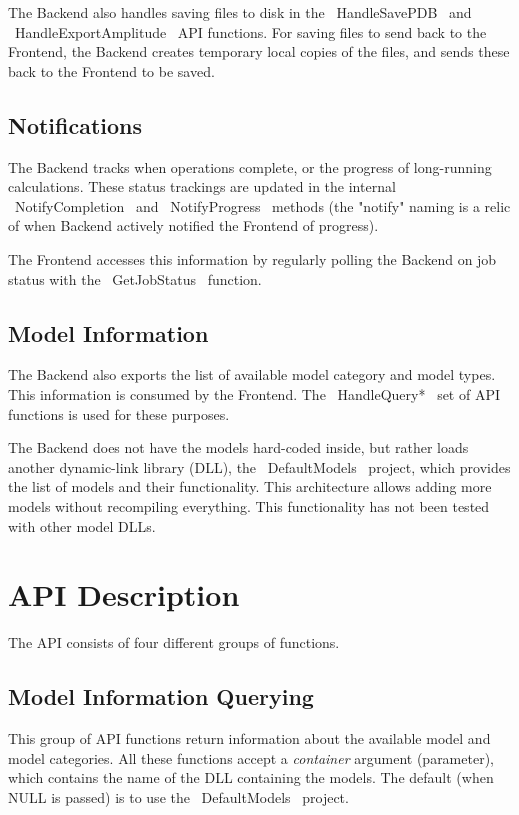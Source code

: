 \documentclass[12pt]{article}
\begin{document}
The Backend also handles saving files to disk in the ~HandleSavePDB~ and ~HandleExportAmplitude~ API functions. For saving files to send back to the Frontend, the Backend creates temporary local copies of the files, and sends these back to the Frontend to be saved.

\subsection{Notifications}
The Backend tracks when operations complete, or the progress of long-running calculations. These status trackings are updated in the internal ~NotifyCompletion~ and ~NotifyProgress~ methods (the "notify" naming is a relic of when Backend actively notified the Frontend of progress).

The Frontend accesses this information by regularly polling the Backend on job status with the ~GetJobStatus~ function.

\subsection{Model Information}
The Backend also exports the list of available model category and model types. This information is consumed by the Frontend. The ~HandleQuery*~ set of API functions is used for these purposes.

The Backend does not have the models hard-coded inside, but rather loads another dynamic-link library  (DLL), the ~DefaultModels~ project, which provides the list of models and their functionality. This architecture allows adding more models without recompiling everything. This functionality has not been tested with other model DLLs.

\section{API Description}
The API consists of four different groups of functions.

\subsection{Model Information Querying}
This group of API functions return information about the available model and model categories. All these functions accept a \emph{container} argument (parameter), which contains the name of the DLL containing the models. The default (when NULL is passed) is to use the ~DefaultModels~ project.
\end{document}
